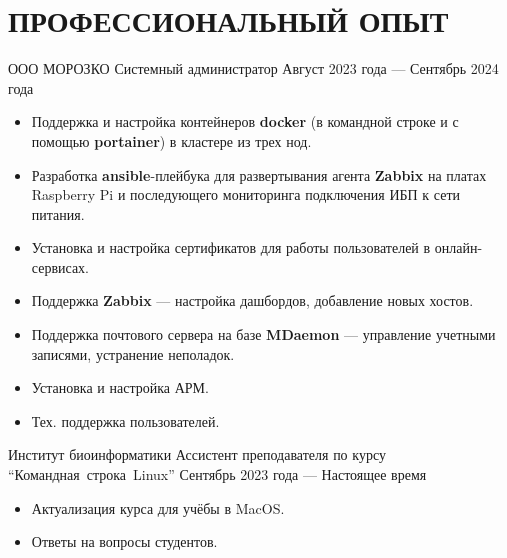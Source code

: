 \section{ПРОФЕССИОНАЛЬНЫЙ ОПЫТ}

    \job
        {ООО МОРОЗКО}
        {Системный администратор}
        {Август 2023 года --- Сентябрь 2024 года}

        \begin{itemize}
            \setlength\itemsep{-.5em}
            \item Поддержка и настройка контейнеров \textbf{docker} (в командной строке и с помощью \textbf{portainer}) в кластере из трех нод.
            \item Разработка \textbf{ansible}-плейбука для развертывания агента \textbf{Zabbix} на платах Raspberry Pi и последующего мониторинга подключения ИБП к сети питания.
            \item Установка и настройка сертификатов для работы пользователей в онлайн-сервисах.
            \item Поддержка \textbf{Zabbix} — настройка дашбордов, добавление новых хостов.
            \item Поддержка почтового сервера на базе \textbf{MDaemon} — управление учетными записями, устранение неполадок.
            \item Установка и настройка АРМ.
            \item Тех. поддержка пользователей.
        \end{itemize}

        \vspace{-0.5em}
    
    \job
        {Институт биоинформатики}
        {Ассистент преподавателя по курсу “\mbox{Командная}~строка~Linux”}
        {Сентябрь 2023 года — Настоящее время}

        \begin{itemize}
            \setlength\itemsep{-.5em}
            \item Актуализация курса для учёбы в MacOS.
            \item Ответы на вопросы студентов.
        \end{itemize}
